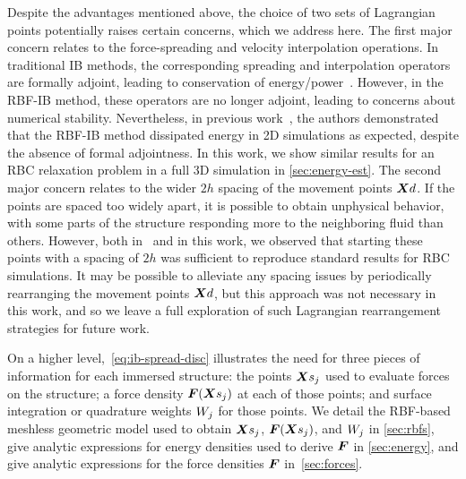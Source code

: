 Despite the advantages mentioned above, the choice of two sets of Lagrangian points potentially raises certain
concerns, which we address here. The first major concern relates to the force-spreading and velocity interpolation
operations. In traditional IB methods, the corresponding spreading and interpolation operators are formally
adjoint, leading to conservation of energy/power~\cite{Peskin:2002go}. However, in the RBF-IB method, these
operators are no longer adjoint, leading to concerns about numerical stability. Nevertheless, in previous
work~\cite{Shankar:2015km}, the authors demonstrated that the RBF-IB method dissipated energy in 2D simulations as
expected, despite the absence of formal adjointness. In this work, we show similar results for an RBC relaxation
problem in a full 3D simulation in \cref{sec:energy-est}. The second major concern relates to the wider $2h$
spacing of the movement points $\data\X$. If the points are spaced too widely apart, it is possible to obtain
unphysical behavior, with some parts of the structure responding more to the neighboring fluid than others.
However, both in~\cite{Shankar:2015km} and in this work, we observed that starting these points with a spacing of
$2h$ was sufficient to reproduce standard results for RBC simulations. It may be possible to alleviate any spacing
issues by periodically rearranging the movement points $\data\X$, but this approach was not necessary in this
work, and so we leave a full exploration of such Lagrangian rearrangement strategies for future work.

On a higher level,~\eqref{eq:ib-spread-disc} illustrates the need for three pieces of information for each
immersed structure: the points $\Xsj$ used to evaluate forces on the structure; a force density $\F(\Xsj)$ at each
of those points; and surface integration or quadrature weights $\weight[j]$ for those points. We detail the
RBF-based meshless geometric model used to obtain $\Xsj$, $\F(\Xsj)$, and $\weight[j]$ in \cref{sec:rbfs}, give
analytic expressions for energy densities used to derive $\boldsymbol{F}$ in \cref{sec:energy}, and give analytic expressions
for the force densities $\boldsymbol{F}$ in~\ref{sec:forces}.
